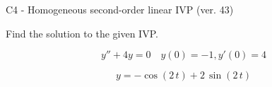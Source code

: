 \begin{exercise}
  \begin{exerciseTitle}C4 - Homogeneous second-order linear IVP (ver. 43)\end{exerciseTitle}
  \begin{exerciseStatement}
    
Find the solution to the given IVP.

    
\[y''+4y = 0 \hspace{1em} y(0) = -1 , y'(0) = 4\]

  \end{exerciseStatement}
  \begin{exerciseAnswer}
    
\[y= -\cos\left(2 \, t\right) + 2 \, \sin\left(2 \, t\right)\]

  \end{exerciseAnswer}
\end{exercise}